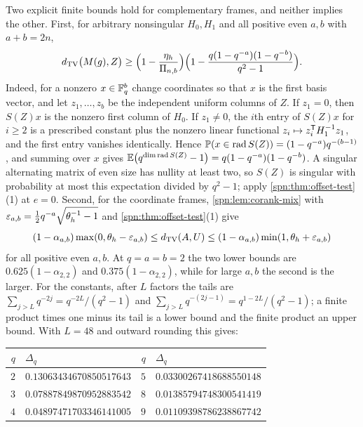 \begin{remark}\label{spn:rem:enclosure}
Two explicit finite bounds hold for complementary frames, and neither implies the other. First,
for arbitrary nonsingular $H_0,H_1$ and all positive even $a,b$ with $a+b=2n$,
\begin{equation}\label{spn:cor:balanced-lower}
 d_{\mathrm{TV}}\bigl(M(g),Z\bigr)\ge\Bigl(1-\frac{\eta_h}{\Pi_{n,b}}\Bigr)
 \Bigl(1-\frac{q(1-q^{-a})(1-q^{-b})}{q^2-1}\Bigr).
\end{equation}
Indeed, for a nonzero $x\in\mathbb{F}_q^b$ change coordinates so that $x$ is the first basis vector, and
let $z_1,\dots,z_b$ be the independent uniform columns of $Z$. If $z_1=0$, then $S(Z)x$ is the
nonzero first column of $H_0$. If $z_1\ne0$, the $i$th entry of $S(Z)x$ for $i\ge2$ is a
prescribed constant plus the nonzero linear functional $z_i\mapsto z_i^{\mathsf{T}}H_1^{-1}z_1$, and
the first entry vanishes identically. Hence $\mathbb{P}(x\in\operatorname{rad}S(Z))=(1-q^{-a})q^{-(b-1)}$,
and summing over $x$ gives
$\mathbb{E}\bigl(q^{\dim\operatorname{rad}S(Z)}-1\bigr)=q(1-q^{-a})(1-q^{-b})$. A singular
alternating matrix of even size has nullity at least two, so $S(Z)$ is singular with probability
at most this expectation divided by $q^2-1$; apply \cref{spn:thm:offset-test}(1) at $e=0$.
Second, for the coordinate frames, \cref{spn:lem:corank-mix} with
$\varepsilon_{a,b}=\frac12q^{-a}\sqrt{\theta_h^{-1}-1}$ and \cref{spn:thm:offset-test}(1) give
\[
 (1-\alpha_{a,b})\max(0,\theta_h-\varepsilon_{a,b})\le
 d_{\mathrm{TV}}(A,U)\le(1-\alpha_{a,b})\min(1,\theta_h+\varepsilon_{a,b})
\]
for all positive even $a,b$. At $q=a=b=2$ the two lower bounds are $0.625(1-\alpha_{2,2})$ and
$0.375(1-\alpha_{2,2})$, while for large $a,b$ the second is the larger. For the constants, after $L$ factors the tails are
$\sum_{j>L}q^{-2j}=q^{-2L}/(q^2-1)$ and $\sum_{j>L}q^{-(2j-1)}=q^{1-2L}/(q^2-1)$; a finite product
times one minus its tail is a lower bound and the finite product an upper bound. With $L=48$ and
outward rounding this gives:
\begin{center}\small
\begin{tabular}{rlrl}
\toprule
$q$ & $\Delta_q$ & $q$ & $\Delta_q$\\
\midrule
$2$ & $0.13063434670850517643$ & $5$ & $0.03300267418688550148$\\
$3$ & $0.07887849870952883542$ & $8$ & $0.01385794748300541419$\\
$4$ & $0.04897471703346141005$ & $9$ & $0.01109398786238867742$\\
\bottomrule
\end{tabular}
\end{center}
\end{remark}

